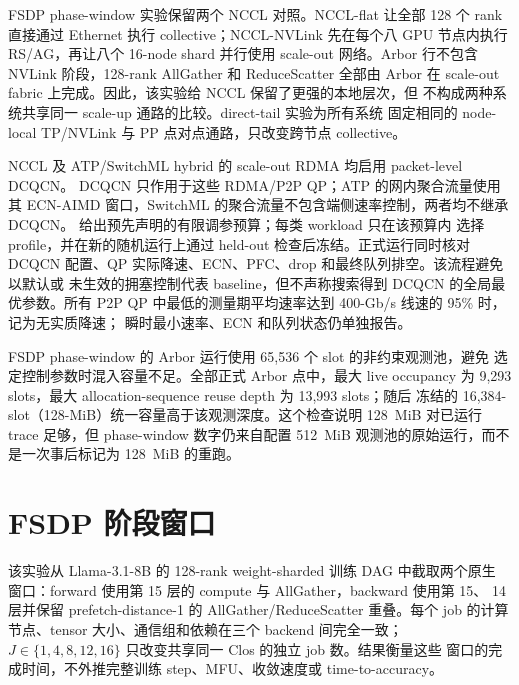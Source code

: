 FSDP phase-window 实验保留两个 NCCL 对照。NCCL-flat 让全部 128 个 rank
直接通过 Ethernet 执行 collective；NCCL-NVLink 先在每个八 GPU 节点内执行
RS/AG，再让八个 16-node shard 并行使用 scale-out 网络。Arbor 行不包含
NVLink 阶段，128-rank AllGather 和 ReduceScatter 全部由 Arbor 在
scale-out fabric 上完成。因此，该实验给 NCCL 保留了更强的本地层次，但
不构成两种系统共享同一 scale-up 通路的比较。direct-tail 实验为所有系统
固定相同的 node-local TP/NVLink 与 PP 点对点通路，只改变跨节点 collective。

NCCL 及 ATP/SwitchML hybrid 的 scale-out RDMA 均启用 packet-level DCQCN。
DCQCN 只作用于这些 RDMA/P2P QP；ATP 的网内聚合流量使用其 ECN-AIMD
窗口，SwitchML 的聚合流量不包含端侧速率控制，两者均不继承 DCQCN。
 给出预先声明的有限调参预算；每类 workload 只在该预算内
选择 profile，并在新的随机运行上通过 held-out 检查后冻结。正式运行同时核对
DCQCN 配置、QP 实际降速、ECN、PFC、drop 和最终队列排空。该流程避免以默认或
未生效的拥塞控制代表 baseline，但不声称搜索得到 DCQCN 的全局最优参数。所有
P2P QP 中最低的测量期平均速率达到 400-Gb/s 线速的 95\% 时，记为无实质降速；
瞬时最小速率、ECN 和队列状态仍单独报告。

FSDP phase-window 的 Arbor 运行使用 65,536 个 slot 的非约束观测池，避免
选定控制参数时混入容量不足。全部正式 Arbor 点中，最大 live occupancy 为
9,293 slots，最大 allocation-sequence reuse depth 为 13,993 slots；随后
冻结的 16,384-slot（128-MiB）统一容量高于该观测深度。这个检查说明
128~MiB 对已运行 trace 足够，但 phase-window 数字仍来自配置 512~MiB
观测池的原始运行，而不是一次事后标记为 128~MiB 的重跑。

\section{FSDP 阶段窗口}
\label{ssec:llm-fsdp-windows}

该实验从 Llama-3.1-8B 的 128-rank weight-sharded 训练 DAG 中截取两个原生
窗口：forward 使用第 15 层的 compute 与 AllGather，backward 使用第 15、
14 层并保留 prefetch-distance-1 的 AllGather/ReduceScatter 重叠。每个
job 的计算节点、tensor 大小、通信组和依赖在三个 backend 间完全一致；
$J\in\{1,4,8,12,16\}$ 只改变共享同一 Clos 的独立 job 数。结果衡量这些
窗口的完成时间，不外推完整训练 step、MFU、收敛速度或 time-to-accuracy。

